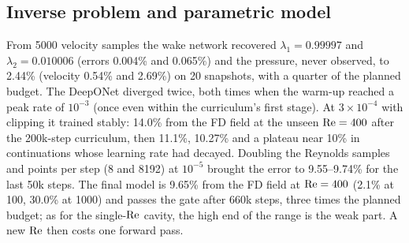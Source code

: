 \subsection{Inverse problem and parametric model}
From 5000 velocity samples the wake network recovered $\lambda_1=0.99997$ and $\lambda_2=0.010006$ (errors 0.004\%
and 0.065\%) and the pressure, never observed, to 2.44\% (velocity 0.54\% and 2.69\%) on 20 snapshots, with a
quarter of the planned budget. The DeepONet diverged twice, both times when the warm-up reached a peak rate of
$10^{-3}$ (once even within the curriculum's first stage). At $3\times10^{-4}$ with clipping it trained stably: 14.0\%
from the FD field at the unseen $\mathrm{Re}=400$ after the 200k-step curriculum, then 11.1\%, 10.27\% and a plateau near
10\% in continuations whose learning rate had decayed. Doubling the Reynolds samples and points per step (8 and
8192) at $10^{-5}$ brought the error to 9.55--9.74\% for the last 50k steps. The final model is 9.65\% from the FD
field at $\mathrm{Re}=400$ (2.1\% at 100, 30.0\% at 1000) and passes the gate after 660k steps, three times the planned
budget; as for the single-$\mathrm{Re}$ cavity, the high end of the range is the weak part. A new $\mathrm{Re}$ then costs one
forward pass.

